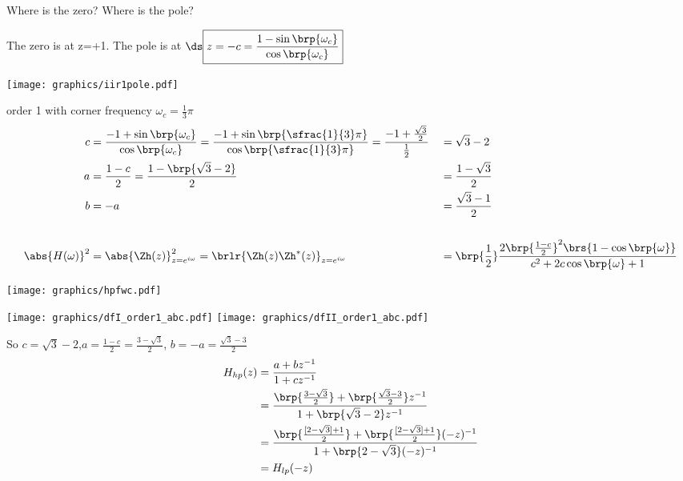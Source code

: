 Where is the zero? Where is the pole?

The zero is at z=+1. \qquad The pole is at 
$\ds\boxed{z=-c = \frac{1 - \sin\brp{\omega_c}}
                    {\cos\brp{\omega_c}}}$

\texttt{[image: graphics/iir1pole.pdf]}


\begin{example}order 1  with corner frequency $\omega_c=\frac{1}{3}\pi$
\begin{align*}
  c &= \frac{-1 + \sin\brp{\omega_c}}{\cos\brp{\omega_c}}
     = \frac{-1 + \sin\brp{\sfrac{1}{3}\pi}}{\cos\brp{\sfrac{1}{3}\pi}}
     = \frac{-1 + \frac{\sqrt{3}}{2}}{\frac{1}{2}}
   &&= \sqrt{3} - 2
  \\
  a &= \frac{1-c}{2}
     = \frac{1-\brp{\sqrt{3} - 2}}{2}
   &&= \frac{1-\sqrt{3}}{2}
  \\
  b &= -a
   &&= \frac{\sqrt{3} - 1}{2}
  \\
  \\
  \abs{H(\omega)}^2
    &= \abs{\Zh(z)}^2_{z=e^{i\omega}}
     = \brlr{\Zh(z)\Zh^\ast(z)}_{z=e^{i\omega}}
   &&= \brp{\frac{1}{2}}\frac{2\brp{\frac{1-c}{2}}^2\brs{1 -  \cos\brp{\omega}}}
            {c^2 + 2 c\cos\brp{\omega} + 1}
\end{align*}


\texttt{[image: graphics/hpfwc.pdf]}

\texttt{[image: graphics/dfI\_order1\_abc.pdf]}
\texttt{[image: graphics/dfII\_order1\_abc.pdf]}
\end{example}


So $c=\sqrt{3}-2$,\qquad $a=\frac{1-c}{2}=\frac{3-\sqrt{3}}{2}$, \qquad $b=-a=\frac{\sqrt{3}-3}{2}$
\begin{align*}
  H_{hp}(z)
    &= \frac{a + bz^{-1}}{1+cz^{-1}}
  \\&= \frac{\brp{\frac{3-\sqrt{3}}{2}} + \brp{\frac{\sqrt{3}-3}{2}}z^{-1}}
            {1+\brp{\sqrt{3}-2}z^{-1}}
  \\&= \frac{\brp{\frac{[2-\sqrt{3}]+1}{2}} + \brp{\frac{[2-\sqrt{3}]+1}{2}}(-z)^{-1}}
            {1+\brp{2-\sqrt{3}}(-z)^{-1}}
  \\&= H_{lp}(-z)
\end{align*}



